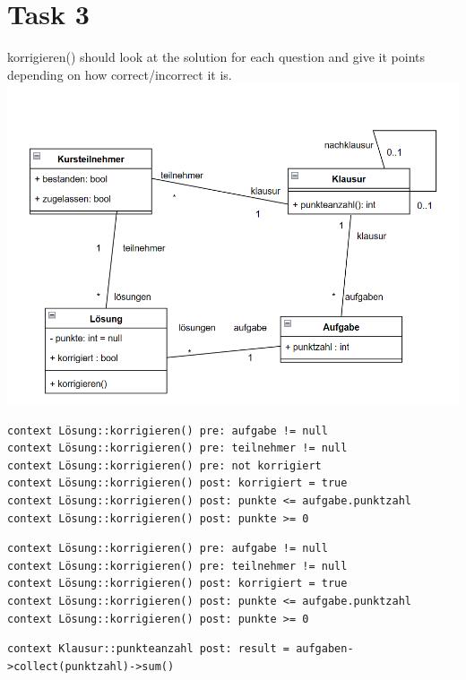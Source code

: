 \chapter{Task 3}
\begin{parlist}
  \item korrigieren() should look at the solution for each question and give it points depending on how correct/incorrect it is.
  \includegraphics[width=\textwidth]{Immagini/aufg3}
  \item \begin{lstlisting}[language=ocl, frame=trBL]
context Lösung::korrigieren() pre: aufgabe != null
context Lösung::korrigieren() pre: teilnehmer != null
context Lösung::korrigieren() pre: not korrigiert
context Lösung::korrigieren() post: korrigiert = true
context Lösung::korrigieren() post: punkte <= aufgabe.punktzahl
context Lösung::korrigieren() post: punkte >= 0
  \end{lstlisting}
  \item\begin{lstlisting}[language=ocl, frame=trBL]
context Lösung::korrigieren() pre: aufgabe != null
context Lösung::korrigieren() pre: teilnehmer != null
context Lösung::korrigieren() post: korrigiert = true
context Lösung::korrigieren() post: punkte <= aufgabe.punktzahl
context Lösung::korrigieren() post: punkte >= 0
  \end{lstlisting}
  \item\begin{lstlisting}[language=ocl, frame=trBL]
context Klausur::punkteanzahl post: result = aufgaben->collect(punktzahl)->sum()
  \end{lstlisting}
\end{parlist}
